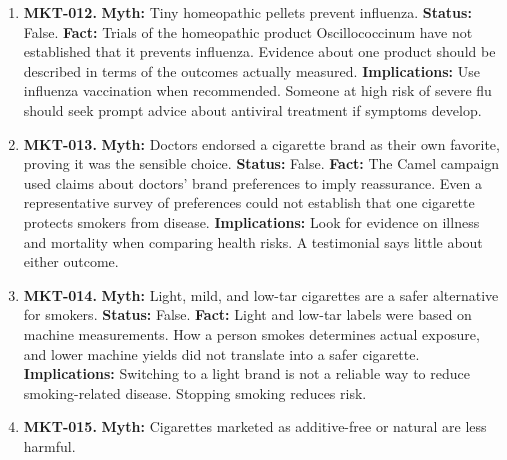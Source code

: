 \documentclass[11pt,oneside]{book}
\begin{document}
\begin{enumerate}[leftmargin=0pt,labelwidth=0pt,labelsep=0pt,itemindent=0pt]
\textbf{Fact:} Clinical evidence has not established essential oils as treatments for cancer, autism, or serious infections. A scent used for comfort is a different intervention from a medicine shown to alter a disease course. \cite{ref97,ref453}\newline
\textbf{Implications:} Do not delay clinical care for a serious infection or cancer. Ask about safety before applying a concentrated oil or taking any oil by mouth.
\item[] \textbf{MKT-012.} \textbf{Myth:} Tiny homeopathic pellets prevent influenza.\newline
\textbf{Status:} False.\newline
\textbf{Fact:} Trials of the homeopathic product Oscillococcinum have not established that it prevents influenza. Evidence about one product should be described in terms of the outcomes actually measured. \cite{ref467,ref40}\newline
\textbf{Implications:} Use influenza vaccination when recommended. Someone at high risk of severe flu should seek prompt advice about antiviral treatment if symptoms develop.
\item[] \textbf{MKT-013.} \textbf{Myth:} Doctors endorsed a cigarette brand as their own favorite, proving it was the sensible choice.\newline
\textbf{Status:} False.\newline
\textbf{Fact:} The Camel campaign used claims about doctors' brand preferences to imply reassurance. Even a representative survey of preferences could not establish that one cigarette protects smokers from disease. \cite{ref100,ref101}\newline
\textbf{Implications:} Look for evidence on illness and mortality when comparing health risks. A testimonial says little about either outcome.
\item[] \textbf{MKT-014.} \textbf{Myth:} Light, mild, and low-tar cigarettes are a safer alternative for smokers.\newline
\textbf{Status:} False.\newline
\textbf{Fact:} Light and low-tar labels were based on machine measurements. How a person smokes determines actual exposure, and lower machine yields did not translate into a safer cigarette. \cite{ref101,ref102}\newline
\textbf{Implications:} Switching to a light brand is not a reliable way to reduce smoking-related disease. Stopping smoking reduces risk.
\item[] \textbf{MKT-015.} \textbf{Myth:} Cigarettes marketed as additive-free or natural are less harmful.\newline

\end{enumerate}
\end{document}
